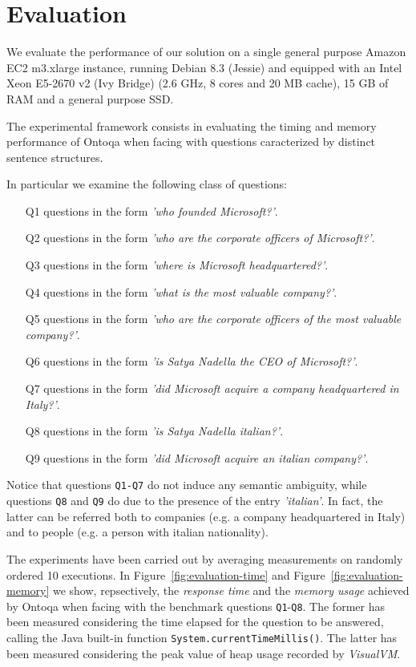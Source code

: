 \section{Evaluation}
\label{sec:evaluation}
We evaluate the performance of our solution on a single general purpose
Amazon EC2 m3.xlarge instance, running Debian 8.3 (Jessie)
and equipped with an Intel Xeon E5-2670 v2 (Ivy Bridge)  (2.6 GHz,
8 cores and 20 MB cache), 15 GB of RAM and a general purpose SSD.

The experimental framework consists in evaluating the timing and memory performance of Ontoqa when facing with questions caracterized by distinct sentence structures.

In particular we examine the following class of questions:

\begin{itemize}
	\item[Q1] questions in the form \textit{'who founded Microsoft?'}.
	\item[Q2] questions in the form \textit{'who are the corporate officers of Microsoft?'}.
	\item[Q3] questions in the form \textit{'where is Microsoft headquartered?'}.
	\item[Q4] questions in the form \textit{'what is the most valuable company?'}.
	\item[Q5] questions in the form \textit{'who are the corporate officers of the most valuable company?'}.
	\item[Q6] questions in the form \textit{'is Satya Nadella the CEO of Microsoft?'}.
	\item[Q7] questions in the form \textit{'did Microsoft acquire a company headquartered in Italy?'}.
	\item[Q8] questions in the form \textit{'is Satya Nadella italian?'}.
	\item[Q9] questions in the form \textit{'did Microsoft acquire an italian company?'}.
\end{itemize}

Notice that questions \texttt{Q1-Q7} do not induce any semantic ambiguity, while questions \texttt{Q8} and \texttt{Q9} do due to the presence of the entry \textit{'italian'}. In fact, the latter can be referred both to companies (e.g. a company headquartered in Italy) and to people (e.g. a person with italian nationality).

The experiments have been carried out by averaging measurements on randomly ordered 10 executions.
%
In Figure~\ref{fig:evaluation-time} and Figure~\ref{fig:evaluation-memory} we show, repsectively, the \textit{response time} and the \textit{memory usage} achieved by Ontoqa when facing with the benchmark questions \texttt{Q1}-\texttt{Q8}.
%
The former has been measured considering the time elapsed for the question to be answered, calling the Java built-in function \texttt{System.currentTimeMillis()}.
%
The latter has been measured considering the peak value of heap usage recorded by \textit{VisualVM}.

